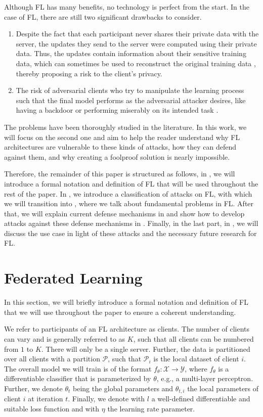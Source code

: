 \documentclass[conference]{IEEEtran}
\begin{document}
Although FL has many benefits, no technology is perfect from the start. In the case of FL, there are still two significant drawbacks to consider.
\begin{enumerate}
    \item Despite the fact that each participant never shares their private data with the server, the updates they send to the server were computed using their private data. Thus, the updates contain information about their sensitive training data, which can sometimes be used to reconstruct the original training data \cite{Zhu2020, Balunovic2022}, thereby proposing a risk to the client's privacy.
    \item The risk of adversarial clients who try to manipulate the learning process such that the final model performs as the adversarial attacker desires, like having a backdoor\cite{Bagdasaryan2018} or performing miserably on its intended task \cite{Fang2019}.
\end{enumerate}
The problems have been thoroughly studied in the literature. In this work, we will focus on the second one and aim to help the reader understand why FL architectures are vulnerable to these kinds of attacks, how they can defend against them, and why creating a foolproof solution is nearly impossible.

Therefore, the remainder of this paper is structured as follows, in , we will introduce a formal notation and definition of FL that will be used throughout the rest of the paper. In , we introduce a classification of attacks on FL, with which we will transition into , where we talk about fundamental problems in FL. After that, we will explain current defense mechanisms in  and show how to develop attacks against these defense mechanisms in . Finally, in the last part, in , we will discuss the use case in light of these attacks and the necessary future research for FL.

\section{Federated Learning}\label{sec:fl}
In this section, we will briefly introduce a formal notation and definition of FL that we will use throughout the paper to ensure a coherent understanding.

We refer to participants of an FL architecture as clients. The number of clients can vary and is generally referred to as $K$, such that all clients can be numbered from $1$ to $K$. There will only be a single server. Further, the data is partitioned over all clients with a partition $\mathcal{P}$, such that $\mathcal{P}_i$ is the local dataset of client $i$. The overall model we will train is of the format $f_\theta: \mathcal{X} \rightarrow \mathcal{Y}$, where $f_\theta$ is a differentiable classifier that is parameterized by $\theta$, e.g., a multi-layer perceptron. Further, we denote $\theta_t$ being the global parameters and $\theta_{t,i}$ the local parameters of client $i$ at iteration $t$. Finally, we denote with $l$ a well-defined differentiable and suitable loss function and with $\eta$ the learning rate parameter.
\end{document}
